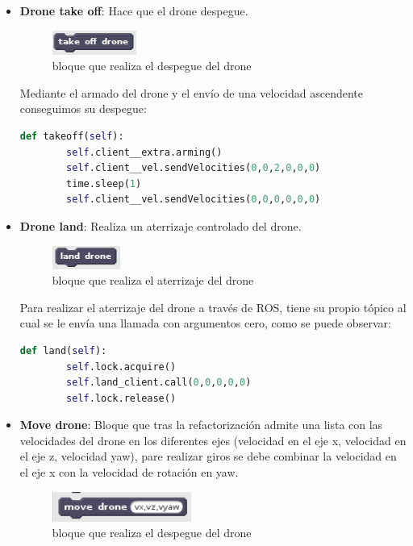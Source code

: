 \begin{itemize}
\begin{itemize}
\begin{lstlisting}[language=python,firstnumber=1]
\end{lstlisting}

	\item \textbf{Drone take off}: Hace que el drone despegue.\\
	\begin{figure}[H]
     		\centering
     		\includegraphics[scale=1.2]{img/block-takeoff.png}
     		\caption{bloque que realiza el despegue del drone}
  		\label{fig:listas}
  				\end{figure}
  				
Mediante el armado del drone y el envío de una velocidad ascendente conseguimos su despegue:\\

 \begin{lstlisting}[language=python,firstnumber=1]
    def takeoff(self):
        self.client__extra.arming()
        self.client__vel.sendVelocities(0,0,2,0,0,0)
        time.sleep(1)
        self.client__vel.sendVelocities(0,0,0,0,0,0)
\end{lstlisting}

	\item \textbf{Drone land}: Realiza un aterrizaje controlado del drone.\\
	\begin{figure}[H]
     		\centering
     		\includegraphics[scale=1.2]{img/block-land.png}
     		\caption{bloque que realiza el aterrizaje del drone}
  		\label{fig:listas}
  				\end{figure}
Para realizar el aterrizaje del drone a través de ROS, tiene su propio tópico al cual se le envía una llamada con argumentos cero, como se puede observar:\\

 \begin{lstlisting}[language=python,firstnumber=1]
    def land(self):
        self.lock.acquire()
        self.land_client.call(0,0,0,0,0)
        self.lock.release()
\end{lstlisting}
	

	\item \textbf{Move drone}: Bloque que tras la refactorización admite una lista con las velocidades del drone en los diferentes ejes (velocidad en el eje x, velocidad en el eje z, velocidad yaw), pare realizar giros se debe combinar la velocidad en el eje x con la velocidad de rotación en yaw.\\
	\begin{figure}[H]
     		\centering
     		\includegraphics[scale=1.2]{img/block-move-drone.png}
     		\caption{bloque que realiza el despegue del drone}
  		\label{fig:listas}
  	\end{figure}
  	

\end{itemize}
\end{itemize}
